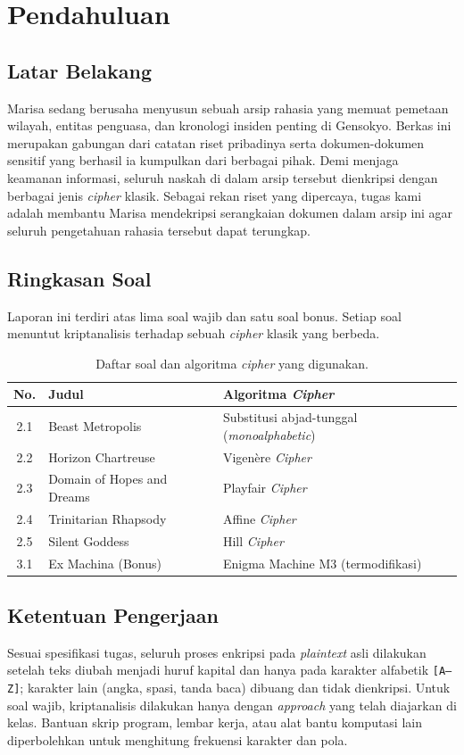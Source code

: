 \chapter{Pendahuluan}

\section{Latar Belakang}

Marisa sedang berusaha menyusun sebuah arsip rahasia yang memuat pemetaan
wilayah, entitas penguasa, dan kronologi insiden penting di Gensokyo. Berkas
ini merupakan gabungan dari catatan riset pribadinya serta dokumen-dokumen
sensitif yang berhasil ia kumpulkan dari berbagai pihak. Demi menjaga keamanan
informasi, seluruh naskah di dalam arsip tersebut dienkripsi dengan berbagai
jenis \textit{cipher} klasik. Sebagai rekan riset yang dipercaya, tugas kami
adalah membantu Marisa mendekripsi serangkaian dokumen dalam arsip ini agar
seluruh pengetahuan rahasia tersebut dapat terungkap.

\section{Ringkasan Soal}

Laporan ini terdiri atas lima soal wajib dan satu soal bonus. Setiap soal
menuntut kriptanalisis terhadap sebuah \textit{cipher} klasik yang berbeda.

\begin{table}[H]
\centering
\begin{tabular}{c l l}
\toprule
\textbf{No.} & \textbf{Judul} & \textbf{Algoritma \textit{Cipher}} \\
\midrule
2.1 & Beast Metropolis          & Substitusi abjad-tunggal (\textit{monoalphabetic}) \\
2.2 & Horizon Chartreuse        & Vigen\`ere \textit{Cipher} \\
2.3 & Domain of Hopes and Dreams & Playfair \textit{Cipher} \\
2.4 & Trinitarian Rhapsody      & Affine \textit{Cipher} \\
2.5 & Silent Goddess            & Hill \textit{Cipher} \\
\midrule
3.1 & Ex Machina (Bonus)        & Enigma Machine M3 (termodifikasi) \\
\bottomrule
\end{tabular}
\caption{Daftar soal dan algoritma \textit{cipher} yang digunakan.}
\end{table}

\section{Ketentuan Pengerjaan}

Sesuai spesifikasi tugas, seluruh proses enkripsi pada \textit{plaintext} asli
dilakukan setelah teks diubah menjadi huruf kapital dan hanya pada karakter
alfabetik \texttt{[A--Z]}; karakter lain (angka, spasi, tanda baca) dibuang dan
tidak dienkripsi. Untuk soal wajib, kriptanalisis dilakukan hanya dengan
\textit{approach} yang telah diajarkan di kelas. Bantuan skrip program, lembar
kerja, atau alat bantu komputasi lain diperbolehkan untuk menghitung frekuensi
karakter dan pola.
